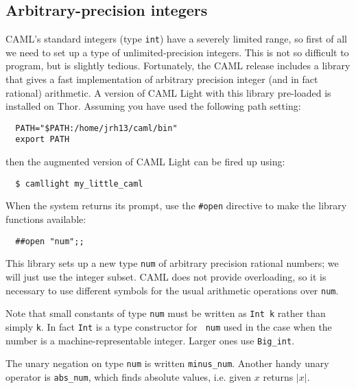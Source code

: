 \subsection{Arbitrary-precision integers}

CAML's standard integers (type {\tt int}) have a severely limited range, so
first of all we need to set up a type of unlimited-precision integers. This is
not so difficult to program, but is slightly tedious. Fortunately, the CAML
release includes a library that gives a fast implementation of arbitrary
precision integer (and in fact rational) arithmetic. A version of CAML Light
with this library pre-loaded is installed on Thor. Assuming you have used the
following path setting:

\begin{boxed}\begin{verbatim}
  PATH="$PATH:/home/jrh13/caml/bin"
  export PATH
\end{verbatim}\end{boxed}

\noindent then the augmented version of CAML Light can be fired up using:

\begin{boxed}\begin{verbatim}
  $ camllight my_little_caml
\end{verbatim}\end{boxed}

When the system returns its prompt, use the {\verb+#open+} directive to make
the library functions available:

\begin{boxed}\begin{verbatim}
  ##open "num";;
\end{verbatim}\end{boxed}

This library sets up a new type {\tt num} of arbitrary precision rational
numbers; we will just use the integer subset. CAML does not provide
overloading, so it is necessary to use different symbols for the usual
arithmetic operations over {\tt num}.

Note that small constants of type {\tt num} must be written as {\tt Int k}
rather than simply {\tt k}. In fact {\tt Int} is a type constructor for {\tt
num} used in the case when the number is a machine-representable integer.
Larger ones use {\tt Big\_int}.

The unary negation on type {\tt num} is written {\tt minus\_num}. Another handy
unary operator is {\tt abs\_num}, which finds absolute values, i.e. given $x$
returns $|x|$.

